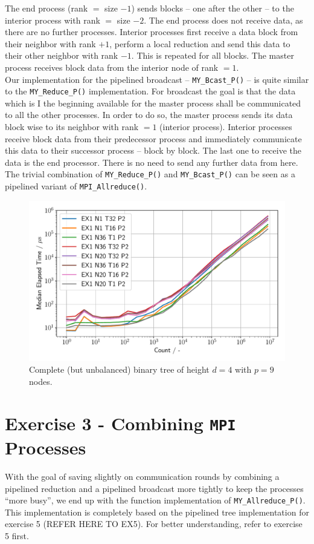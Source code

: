 The end process (rank $=$ size $-1$) sends blocks – one after the other -- to the interior process with 
rank $=$ size $-2$. The end process does not receive data, as there are no further processes. Interior processes 
first receive a data block from their neighbor with rank $+1$, perform a local reduction and send this data to their 
other neighbor with rank $-1$. This is repeated for all blocks. The master process receives block data from the interior 
node of rank $=1$.\\

Our implementation for the pipelined broadcast -- \texttt{MY\_Bcast\_P()} – is quite similar to the 
\texttt{MY\_Reduce\_P()} implementation. For broadcast the goal is that the data which is I the beginning 
available for the master process shall be communicated to all the other processes. In order to do so, the master 
process sends its data block wise to its neighbor with rank $=1$ (interior process). Interior processes receive block 
data from their predecessor process and immediately communicate this data to their successor process – block by 
block. The last one to receive the data is the end processor. There is no need to send any further data from here.\\

The trivial combination of \texttt{MY\_Reduce\_P()} and \texttt{MY\_Bcast\_P()} can be seen as a pipelined variant 
of \texttt{MPI\_Allreduce()}.\\

\begin{figure}[h]
    \begin{center}
        \includegraphics[width=0.3\linewidth]{figures/Ex1_2.pdf}
        \caption{Complete (but unbalanced) binary tree of height $d = 4$ with $p = 9$ nodes.}
    \end{center}
\end{figure}
\pagebreak

\section{Exercise 3 - Combining \texttt{MPI} Processes}
With the goal of saving slightly on communication rounds by combining a pipelined reduction and a 
pipelined broadcast more tightly to keep the processes “more busy”, we end up with the function implementation 
of \texttt{MY\_Allreduce\_P()}. This implementation is completely based on the pipelined tree 
implementation for exercise 5 (REFER HERE TO EX5). For better understanding, refer to exercise 5 first.\\

